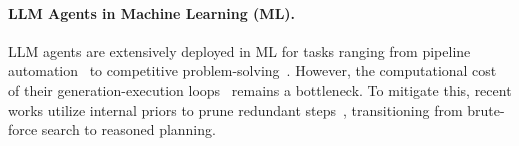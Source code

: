 
\paragraph{LLM Agents in Machine Learning (ML).}
LLM agents are extensively deployed in ML for tasks ranging from pipeline automation~\cite{jiang2025aideaidrivenexplorationspace, qiao2025scalinggeneralistdataanalyticagents, gu2024largelanguagemodelsconstructing} to competitive problem-solving~\cite{luo2025executableknowledgegraphsreplicating, ou2025automindadaptiveknowledgeableagent, chan2025mlebenchevaluatingmachinelearning, liu2025mlmasteraiforaiintegrationexploration}.
However, the computational cost of their generation-execution loops~\cite{yao2023reactsynergizingreasoningacting} remains a bottleneck.
To mitigate this, recent works utilize internal priors to prune redundant steps~\cite{kulibaba2025kompeteaiacceleratedautonomousmultiagent, trirat2025automlagentmultiagentllmframework}, transitioning from brute-force search to reasoned planning.

